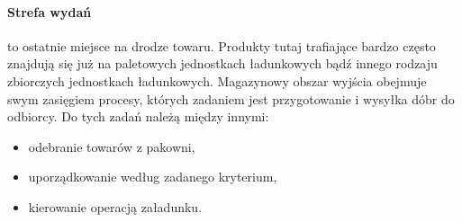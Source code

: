 		\paragraph{Strefa wydań} to ostatnie miejsce na drodze towaru. Produkty tutaj trafiające bardzo często znajdują się już
		na paletowych jednostkach ładunkowych bądź innego rodzaju zbiorczych jednostkach ładunkowych. Magazynowy
		obszar wyjścia obejmuje swym zasięgiem procesy, których zadaniem jest przygotowanie i wysyłka dóbr do odbiorcy. 
		Do tych zadań należą między innymi:
		\begin{itemize}
			\item odebranie towarów z pakowni,
			\item uporządkowanie według zadanego kryterium,
			\item kierowanie operacją załadunku.
		\end{itemize}
